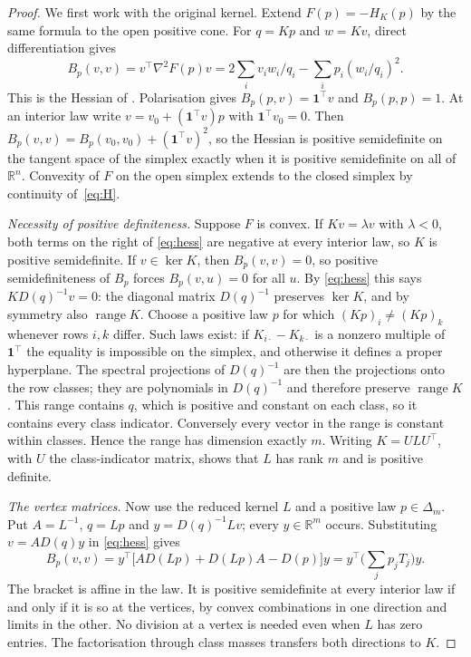 \documentclass[11pt,a4paper]{article}
\theoremstyle{remark}
\newcommand{\one}{\mathbf 1}
\newcommand{\R}{\mathbb R}
\begin{document}
\begin{proof}
We first work with the original kernel. Extend $F(p)=-H_K(p)$ by the same formula to the open positive cone. For $q=Kp$ and $w=Kv$, direct differentiation gives
\begin{equation}\label{eq:hess}
 B_p(v,v)=v^\top\nabla^2F(p)v
 =2\sum_i v_i w_i/q_i-\sum_i p_i(w_i/q_i)^2.
\end{equation}
This is the Hessian of \cite[Supplement C.2]{gait}. Polarisation gives $B_p(p,v)=\one^\top v$ and $B_p(p,p)=1$. At an interior law write $v=v_0+(\one^\top v)p$ with $\one^\top v_0=0$. Then $B_p(v,v)=B_p(v_0,v_0)+(\one^\top v)^2$, so the Hessian is positive semidefinite on the tangent space of the simplex exactly when it is positive semidefinite on all of $\R^n$. Convexity of $F$ on the open simplex extends to the closed simplex by continuity of~\eqref{eq:H}.

\emph{Necessity of positive definiteness.} Suppose $F$ is convex. If $Kv=\lambda v$ with $\lambda<0$, both terms on the right of \eqref{eq:hess} are negative at every interior law, so $K$ is positive semidefinite. If $v\in\ker K$, then $B_p(v,v)=0$, so positive semidefiniteness of $B_p$ forces $B_p(v,u)=0$ for all $u$. By \eqref{eq:hess} this says $KD(q)^{-1}v=0$: the diagonal matrix $D(q)^{-1}$ preserves $\ker K$, and by symmetry also $\operatorname{range} K$. Choose a positive law $p$ for which $(Kp)_i\ne(Kp)_k$ whenever rows $i,k$ differ. Such laws exist: if $K_{i\cdot}-K_{k\cdot}$ is a nonzero multiple of $\one^\top$ the equality is impossible on the simplex, and otherwise it defines a proper hyperplane. The spectral projections of $D(q)^{-1}$ are then the projections onto the row classes; they are polynomials in $D(q)^{-1}$ and therefore preserve $\operatorname{range}K$. This range contains $q$, which is positive and constant on each class, so it contains every class indicator. Conversely every vector in the range is constant within classes. Hence the range has dimension exactly $m$. Writing $K=ULU^\top$, with $U$ the class-indicator matrix, shows that $L$ has rank $m$ and is positive definite.

\emph{The vertex matrices.} Now use the reduced kernel $L$ and a positive law $p\in\Delta_m$. Put $A=L^{-1}$, $q=Lp$ and $y=D(q)^{-1}Lv$; every $y\in\R^m$ occurs. Substituting $v=AD(q)y$ in \eqref{eq:hess} gives
\begin{equation}\label{eq:affine}
 B_p(v,v)=y^\top\big[A D(Lp)+D(Lp) A-D(p)\big]y
 =y^\top\Big(\sum_j p_j T_j\Big)y.
\end{equation}
The bracket is affine in the law. It is positive semidefinite at every interior law if and only if it is so at the vertices, by convex combinations in one direction and limits in the other. No division at a vertex is needed even when $L$ has zero entries. The factorisation through class masses transfers both directions to $K$.


\end{proof}
\end{document}
